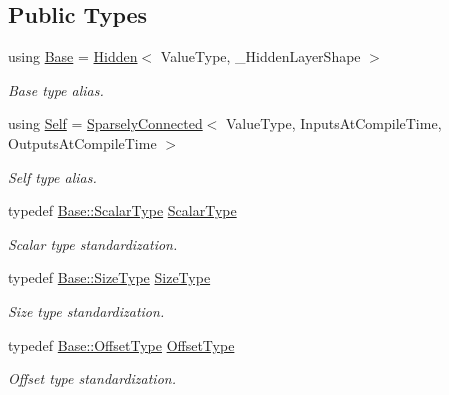 \subsection*{Public Types}
\begin{DoxyCompactItemize}
\item 
using \hyperlink{classffnn_1_1layer_1_1_sparsely_connected_a477e3c462a713ae90ac5d68c94445a08}{Base} = \hyperlink{classffnn_1_1layer_1_1_hidden}{Hidden}$<$ Value\-Type, \-\_\-\-Hidden\-Layer\-Shape $>$
\begin{DoxyCompactList}\small\item\em Base type alias. \end{DoxyCompactList}\item 
using \hyperlink{classffnn_1_1layer_1_1_sparsely_connected_a04d7cf664720eb81c2ac34c9b6025357}{Self} = \hyperlink{classffnn_1_1layer_1_1_sparsely_connected}{Sparsely\-Connected}$<$ Value\-Type, Inputs\-At\-Compile\-Time, Outputs\-At\-Compile\-Time $>$
\begin{DoxyCompactList}\small\item\em Self type alias. \end{DoxyCompactList}\item 
typedef \hyperlink{classffnn_1_1layer_1_1internal_1_1_interface_a7f834e3365e5199bcbcd16d9abd63941}{Base\-::\-Scalar\-Type} \hyperlink{classffnn_1_1layer_1_1_sparsely_connected_ab9a48a183f4883c21290997ff05e7e7d}{Scalar\-Type}
\begin{DoxyCompactList}\small\item\em Scalar type standardization. \end{DoxyCompactList}\item 
typedef \hyperlink{classffnn_1_1layer_1_1internal_1_1_interface_af0567642f60c65b5e87067226a54174b}{Base\-::\-Size\-Type} \hyperlink{classffnn_1_1layer_1_1_sparsely_connected_a8c23b3731363a9c52f0fc2ad9f1a8f2a}{Size\-Type}
\begin{DoxyCompactList}\small\item\em Size type standardization. \end{DoxyCompactList}\item 
typedef \hyperlink{classffnn_1_1layer_1_1internal_1_1_interface_adc5bb454329ebd51ac26579a43c006fd}{Base\-::\-Offset\-Type} \hyperlink{classffnn_1_1layer_1_1_sparsely_connected_a0ca13855542b847611e9734e3d6a9f18}{Offset\-Type}
\begin{DoxyCompactList}\small\item\em Offset type standardization. \end{DoxyCompactList}\item 

\end{DoxyCompactItemize}
